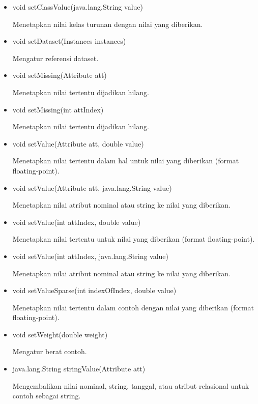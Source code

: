 \begin{itemize}
	\item void setClassValue(java.lang.String value)
	
	Menetapkan nilai kelas turunan dengan nilai yang diberikan.
	
	\item void setDataset(Instances instances)
	
	Mengatur referensi dataset.
	
	\item void setMissing(Attribute att)
	
	Menetapkan nilai tertentu dijadikan hilang.
	
	\item void setMissing(int attIndex)
	
	Menetapkan nilai tertentu dijadikan hilang.
	
	\item void setValue(Attribute att, double value)
	
	Menetapkan nilai tertentu dalam hal untuk nilai yang diberikan (format floating-point).
	
	\item void setValue(Attribute att, java.lang.String value)
	
	Menetapkan nilai atribut nominal atau string ke nilai yang diberikan.
	
	\item void setValue(int attIndex, double value)
	
	Menetapkan nilai tertentu untuk nilai yang diberikan (format floating-point).
	
	\item void setValue(int attIndex, java.lang.String value)
	
	Menetapkan nilai atribut nominal atau string ke nilai yang diberikan.
	
	\item void setValueSparse(int indexOfIndex, double value)
	
	Menetapkan nilai tertentu dalam contoh dengan nilai yang diberikan (format floating-point).
	
	\item void setWeight(double weight)
	
	Mengatur berat contoh.
	
	\item java.lang.String stringValue(Attribute att)
	
	Mengembalikan nilai nominal, string, tanggal, atau atribut relasional untuk contoh sebagai string.
	

\end{itemize}
